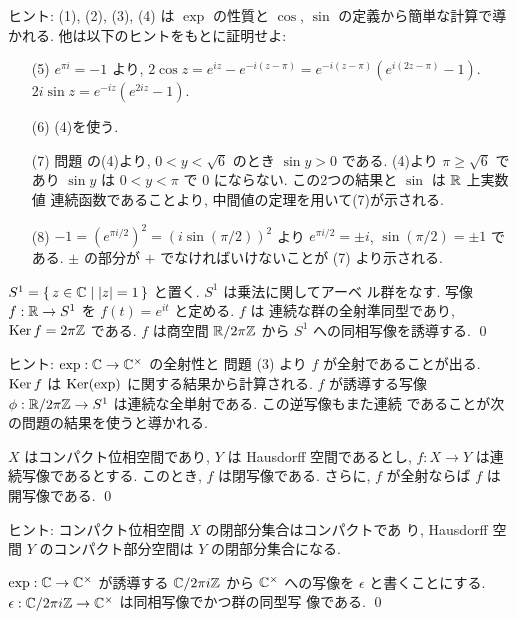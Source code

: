\documentclass[12pt,twoside]{jarticle}
\def\Z{{\Bbb Z}} %
\def\R{{\Bbb R}} %
\def\C{{\Bbb C}} %
\def\Ker{\mathop{\text{\rm Ker}}\nolimits}   %
\begin{document}
\noindent ヒント: (1), (2), (3), (4) は $\exp$ の性質と $\cos$, $\sin$ %
の定義から簡単な計算で導かれる. 他は以下のヒントをもとに証明せよ:
\begin{enumerate}
\item[(5)] $e^{\pi i} = -1$ より,
  $2\cos z = e^{iz} - e^{-i(z-\pi)} = e^{-i(z-\pi)}(e^{i(2z-\pi)} - 1)$.
  $2i\sin z = e^{-iz}(e^{2iz}-1)$.
\item[(6)] (4)を使う.
\item[(7)] 問題  の(4)より, $0<y<\sqrt{6}$ のとき %
  $\sin y > 0$ である. (4)より $\pi \ge \sqrt{6}$ であり $\sin y$ は 
  $0<y<\pi$ で $0$ にならない. この2つの結果と $\sin$ は $\R$ 上実数値
  連続函数であることより, 中間値の定理を用いて(7)が示される.
\item[(8)] $-1 = (e^{\pi i/2})^2 = (i\sin(\pi/2))^2$ より 
  $e^{\pi i/2} = \pm i$, $\sin(\pi/2)=\pm 1$ である. $\pm$ の部分が %
  $+$ でなければいけないことが (7) より示される.
\end{enumerate}

\begin{question}\label{q:exp3}
  $S^1 = \{\, z\in\C\mid |z|=1\,\}$ と置く. $S^1$ は乗法に関してアーベ
  ル群をなす. 写像 $f : \R \to S^1$ を $f(t)=e^{it}$ と定める. $f$ は
  連続な群の全射準同型であり, $\Ker f = 2\pi\Z$ である. 
  $f$ は商空間 $\R/2\pi\Z$ から $S^1$ への同相写像を誘導する. \qed
\end{question}

\noindent ヒント: $\exp : \C \to \C^{\times}$ の全射性と
問題  (3) より $f$ が全射であることが出る. $\Ker f$ は %
$\Ker(\exp)$ に関する結果から計算される. $f$ が誘導する写像 %
$\phi : \R/2\pi\Z \to S^1$ は連続な全単射である. この逆写像もまた連続
であることが次の問題の結果を使うと導かれる.

\begin{question}
  $X$ はコンパクト位相空間であり, $Y$ は Hausdorff 空間であるとし,
  $f : X \to Y$ は連続写像であるとする. このとき, $f$ は閉写像である. 
  さらに, $f$ が全射ならば $f$ は開写像である. 
  \qed
\end{question}

\noindent ヒント: コンパクト位相空間 $X$ の閉部分集合はコンパクトであ
り, Hausdorff 空間 $Y$ のコンパクト部分空間は $Y$ の閉部分集合になる.

\begin{question}\label{q:exp4}
  $\exp : \C \to \C^{\times}$ が誘導する $\C/2\pi i\Z$ から %
  $\C^{\times}$ への写像を $\epsilon$ と書くことにする. 
  $\epsilon : \C/2\pi i\Z \to \C^{\times}$ は同相写像でかつ群の同型写
  像である. \qed
\end{question}
\end{document}
